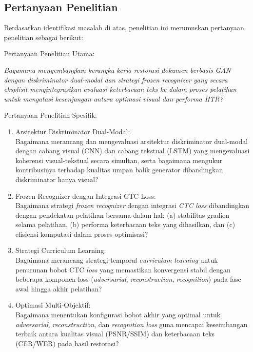 \documentclass[12pt,a4paper]{article}
\begin{document}
\vspace{0pt}
\subsection{Pertanyaan Penelitian}
\label{subsec:pertanyaan-penelitian}

Berdasarkan identifikasi masalah di atas, penelitian ini merumuskan pertanyaan penelitian sebagai berikut:

\vspace{0.5em}
Pertanyaan Penelitian Utama:

\textit{Bagamana mengembangkan kerangka kerja restorasi dokumen berbasis GAN dengan diskriminator dual-modal dan strategi \textit{frozen recognizer} yang secara eksplisit mengintegrasikan evaluasi keterbacaan teks ke dalam proses pelatihan untuk mengatasi kesenjangan antara optimasi visual dan performa HTR?}

\vspace{0.8em}
Pertanyaan Penelitian Spesifik:

\begin{enumerate}[label=\arabic*., leftmargin=0.5cm]
    \item Arsitektur Diskriminator Dual-Modal: \\
    Bagaimana merancang dan mengevaluasi arsitektur diskriminator dual-modal dengan cabang visual (CNN) dan cabang tekstual (LSTM) yang mengevaluasi koherensi visual-tekstual secara simultan, serta bagaimana mengukur kontribusinya terhadap kualitas umpan balik generator dibandingkan diskriminator hanya visual?

    \item Frozen Recognizer dengan Integrasi CTC Loss: \\
    Bagaimana strategi \textit{frozen recognizer} dengan integrasi \textit{CTC loss} dibandingkan dengan pendekatan pelatihan bersama dalam hal: (a) stabilitas gradien selama pelatihan, (b) performa keterbacaan teks yang dihasilkan, dan (c) efisiensi komputasi dalam proses optimisasi?

    \item Strategi Curriculum Learning: \\
    Bagaimana merancang strategi temporal \textit{curriculum learning} untuk penurunan bobot CTC \textit{loss} yang memastikan konvergensi stabil dengan beberapa komponen loss (\textit{adversarial}, \textit{reconstruction}, \textit{recognition}) pada fase awal hingga akhir pelatihan?

    \item Optimasi Multi-Objektif: \\
    Bagaimana menentukan konfigurasi bobot akhir yang optimal untuk \textit{adversarial}, \textit{reconstruction}, dan \textit{recognition loss} guna mencapai keseimbangan terbaik antara kualitas visual (PSNR/SSIM) dan keterbacaan teks (CER/WER) pada hasil restorasi?
\end{enumerate}
\vspace{0.8em}
\end{document}
